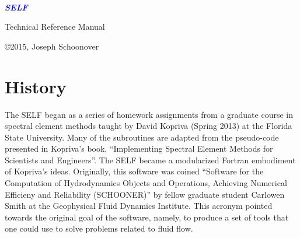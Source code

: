 \documentclass[12pt]{softwaremanual}
\author{Joseph Schoonover, Yuliana Zamora, Priscilla Kelly, Neelam Patel, Jennifer Estrada}
\title{}
\date{}
\begin{document}
\begin{titlingpage}
    
        \vspace*{2cm}
        
     \begin{flushright}
        {\selectfont
        \\
        }
       
        \vspace{1cm}
        
        \huge{
        \textbf{
        \textit{
        \textcolor{blue}{
           SELF
        }}}}
        
     \end{flushright}
         
        \vspace{2cm}
        
     \begin{center}
     
        {\selectfont
        \huge{
           Technical Reference Manual
        }
        
        \vspace{1.5cm}
        
        \textbf{
        \large{
           \theauthor 
         }}}
        
        \vfill
        
        \copyright 2015, Joseph Schoonover
        
     \end{center}
        
    
\end{titlingpage}

\chapter*{History}
 The SELF began as a series of homework assignments from a graduate course in spectral element methods taught by David Kopriva (Spring 2013) at the Florida State University. Many of the subroutines are adapted from the pseudo-code presented in Kopriva's book, ``Implementing Spectral Element Methods for Scientists and Engineers''. The SELF became a modularized Fortran embodiment of Kopriva's ideas. Originally, this software was coined ``Software for the Computation of Hydrodynamics Objects and Operations, Achieving Numerical Efficieny and Reliability (SCHOONER)'' by fellow graduate student Carlowen Smith at the Geophysical Fluid Dynamics Institute. This acronym pointed towards the original goal of the software, namely, to produce a set of tools that one could use to solve problems related to fluid flow.\\
 
\end{document}
